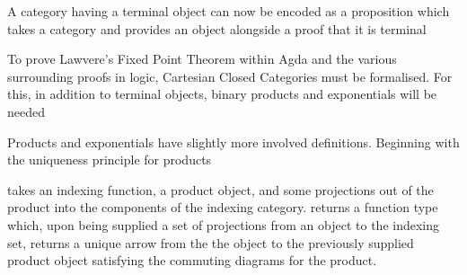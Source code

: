
A category having a terminal object can now be encoded as a proposition which
takes a category and provides an object alongside a proof that it is terminal


To prove Lawvere's Fixed Point Theorem within Agda and the various surrounding
proofs in logic, Cartesian Closed Categories must be formalised. For this, in
addition to terminal objects, binary products and exponentials will be needed


Products and exponentials have slightly more involved definitions. Beginning
with the uniqueness principle for products


 takes an indexing function, a product object, and some
projections out of the product into the components of the indexing
category.  returns a function type which, upon being
supplied a set of projections from an object to the indexing set, returns a
unique arrow from the the object to the previously supplied product object
satisfying the commuting diagrams for the product.


